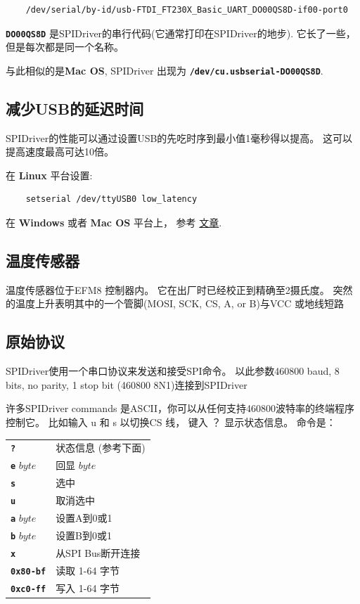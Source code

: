 \documentclass{article}
\newcommand{\mach}[1]{\texttt{\textbf{#1}}}
\newcommand{\gap}{\vspace{10pt}}
\begin{document}
\begin{lstlisting}
    /dev/serial/by-id/usb-FTDI_FT230X_Basic_UART_DO00QS8D-if00-port0
\end{lstlisting}

\mach{DO00QS8D} 是SPIDriver的串行代码(它通常打印在SPIDriver的地步).
它长了一些，但是每次都是同一个名称。 

与此相似的是\textbf{Mac OS}, SPIDriver 出现为 \mach{/dev/cu.usbserial-DO00QS8D}.

\subsection{减少USB的延迟时间}

SPIDriver的性能可以通过设置USB的先吃时序到最小值1毫秒得以提高。 
这可以提高速度最高可达10倍。

在 \textbf{Linux} 平台设置:

\begin{lstlisting}
    setserial /dev/ttyUSB0 low_latency
\end{lstlisting}

在 \textbf{Windows} 或者 \textbf{Mac OS} 平台上， 参考
\href{https://projectgus.com/2011/10/notes-on-ftdi-latency-with-arduino/}{文章}.

\subsection{温度传感器}

温度传感器位于EFM8 控制器内。 它在出厂时已经校正到精确至2摄氏度。 
突然的温度上升表明其中的一个管脚(MOSI, SCK, CS, A, or B)与VCC 或地线短路

\subsection{原始协议}
SPIDriver使用一个串口协议来发送和接受SPI命令。 
以此参数460800 baud, 8 bits, no parity, 1 stop bit (460800 8N1)连接到SPIDriver

许多SPIDriver commands 是ASCII，你可以从任何支持460800波特率的终端程序控制它。
比如输入 u 和 s 以切换CS 线， 键入 ？ 显示状态信息。 
命令是： 


\gap\begin{tabular}{ll}
\hline
\mach{?}        & 状态信息 (参考下面)        \\
\mach{e} $byte$ & 回显 $byte$       \\
\mach{s}        & 选中        \\
\mach{u}        & 取消选中        \\
\mach{a} $byte$ & 设置A到0或1	\\
\mach{b} $byte$ & 设置B到0或1     \\
\mach{x}        & 从SPI Bus断开连接       \\
\mach{0x80-bf}  & 读取 1-64 字节       \\
\mach{0xc0-ff}  & 写入 1-64 字节        \\ \hline
\end{tabular}\gap
\end{document}
